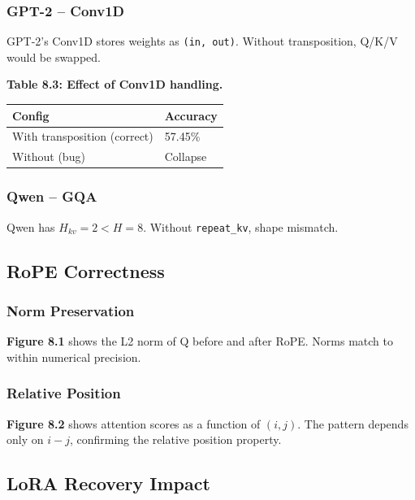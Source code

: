 \subsubsection{GPT-2 -- Conv1D}

GPT-2's Conv1D stores weights as \texttt{(in, out)}. Without transposition, 
Q/K/V would be swapped.

\textbf{Table 8.3: Effect of Conv1D handling.}

\begin{table}[H]
\centering
\small
\begin{tabular}{ll}
\toprule
\textbf{Config} & \textbf{Accuracy} \\
\midrule
With transposition (correct) & 57.45\% \\
Without (bug) & Collapse \\
\bottomrule
\end{tabular}
\end{table}

\subsubsection{Qwen -- GQA}

Qwen has $H_{kv} = 2 < H = 8$. Without \texttt{repeat\_kv}, shape mismatch.

\subsection{RoPE Correctness}

\subsubsection{Norm Preservation}

\textbf{Figure 8.1} shows the L2 norm of Q before and after RoPE. Norms 
match to within numerical precision.

\subsubsection{Relative Position}

\textbf{Figure 8.2} shows attention scores as a function of $(i, j)$. The 
pattern depends only on $i - j$, confirming the relative position 
property.

\subsection{LoRA Recovery Impact}

